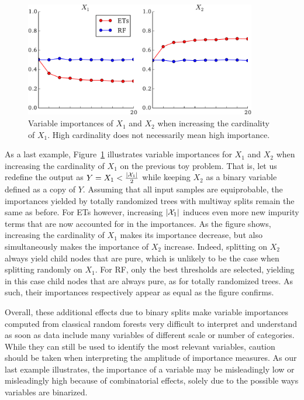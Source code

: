 \begin{figure}
\centering
\includegraphics[width=0.9\textwidth]{figures/ch7_bias_trees.pdf}
\caption{Variable importances of $X_1$ and $X_2$ when increasing the cardinality of $X_1$. High cardinality does not necessarily mean high importance. }
\label{fig:7:bias:trees}
\end{figure}

As a last example, Figure~\ref{fig:7:bias:trees} illustrates variable
importances for $X_1$ and $X_2$ when increasing the cardinality of $X_1$ on the
previous toy problem. That is, let us redefine the output as $Y = X_1 <
\tfrac{|{\cal X}_1|}{2}$ while keeping $X_2$ as a binary variable defined as a
copy of $Y$. Assuming that all input samples are equiprobable, the importances
yielded by totally randomized trees with multiway splits remain the same as
before. For ETs however, increasing $|{\cal X}_1|$ induces even more new impurity terms
that are now accounted for in the importances. As the figure shows, increasing
the cardinality of $X_1$ makes its importance decrease, but also simultaneously
makes the importance of $X_2$ increase. Indeed, splitting on $X_2$ always yield
child nodes that are pure, which is unlikely to be the case when splitting
randomly on $X_1$. For RF, only the best thresholds are selected, yielding in
this case child nodes that are always pure, as for totally randomized trees.
As such, their importances respectively appear as equal as the figure confirms.

Overall, these additional effects due to binary splits make variable
importances computed from classical random forests very difficult to interpret
and understand as soon as data include many variables of different scale
or number of categories. While they can still be
used to identify the most relevant variables, caution should be taken when
interpreting the amplitude of importance measures. As our last example
illustrates, the importance of a variable may be misleadingly low or
misleadingly high because of combinatorial effects, solely due to the possible
ways variables are binarized.

